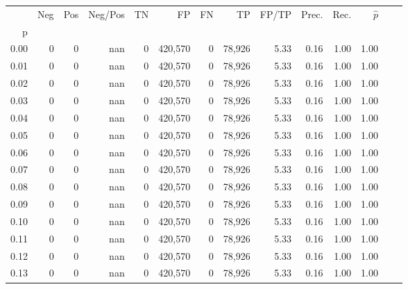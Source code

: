 \begin{tabular}{rrrrrrrrrrrrrr}
\toprule
{} &      Neg &     Pos & Neg/Pos &       TN &       FP &      FN &      TP & FP/TP & Prec. &  Rec. & $\hat{p}$ \\
p    &          &         &         &          &          &         &         &       &       &       &           \\
\midrule
0.00 &        0 &       0 &     nan &        0 &  420,570 &       0 &  78,926 &  5.33 &  0.16 &  1.00 &      1.00 \\
0.01 &        0 &       0 &     nan &        0 &  420,570 &       0 &  78,926 &  5.33 &  0.16 &  1.00 &      1.00 \\
0.02 &        0 &       0 &     nan &        0 &  420,570 &       0 &  78,926 &  5.33 &  0.16 &  1.00 &      1.00 \\
0.03 &        0 &       0 &     nan &        0 &  420,570 &       0 &  78,926 &  5.33 &  0.16 &  1.00 &      1.00 \\
0.04 &        0 &       0 &     nan &        0 &  420,570 &       0 &  78,926 &  5.33 &  0.16 &  1.00 &      1.00 \\
0.05 &        0 &       0 &     nan &        0 &  420,570 &       0 &  78,926 &  5.33 &  0.16 &  1.00 &      1.00 \\
0.06 &        0 &       0 &     nan &        0 &  420,570 &       0 &  78,926 &  5.33 &  0.16 &  1.00 &      1.00 \\
0.07 &        0 &       0 &     nan &        0 &  420,570 &       0 &  78,926 &  5.33 &  0.16 &  1.00 &      1.00 \\
0.08 &        0 &       0 &     nan &        0 &  420,570 &       0 &  78,926 &  5.33 &  0.16 &  1.00 &      1.00 \\
0.09 &        0 &       0 &     nan &        0 &  420,570 &       0 &  78,926 &  5.33 &  0.16 &  1.00 &      1.00 \\
0.10 &        0 &       0 &     nan &        0 &  420,570 &       0 &  78,926 &  5.33 &  0.16 &  1.00 &      1.00 \\
0.11 &        0 &       0 &     nan &        0 &  420,570 &       0 &  78,926 &  5.33 &  0.16 &  1.00 &      1.00 \\
0.12 &        0 &       0 &     nan &        0 &  420,570 &       0 &  78,926 &  5.33 &  0.16 &  1.00 &      1.00 \\
0.13 &        0 &       0 &     nan &        0 &  420,570 &       0 &  78,926 &  5.33 &  0.16 &  1.00 &      1.00 \\

\end{tabular}
